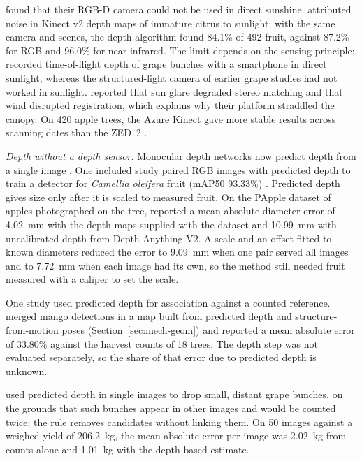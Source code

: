 \citet{wang2017tree} found that their RGB-D camera could not be used in direct sunshine. \citet{choi2017performance} attributed noise in Kinect v2 depth maps of immature citrus to sunlight; with the same camera and scenes, the depth algorithm found 84.1\% of 492 fruit, against 87.2\% for RGB and 96.0\% for near-infrared. The limit depends on the sensing principle: \citet{parr2023grape} recorded time-of-flight depth of grape bunches with a smartphone in direct sunlight, whereas the structured-light camera of earlier grape studies had not worked in sunlight. \citet{qureshi2023seeing} reported that sun glare degraded stereo matching and that wind disrupted registration, which explains why their platform straddled the canopy. On 420 apple trees, the Azure Kinect gave more stable results across scanning dates than the ZED~2 \citep{felippomes2026video}.

\textit{Depth without a depth sensor.} Monocular depth networks now predict depth from a single image \citep{ranftl2021vision}. One included study paired RGB images with predicted depth to train a detector for \textit{Camellia oleifera} fruit (mAP50 93.33\%) \citep{chen2026ciafnet}. Predicted depth gives size only after it is scaled to measured fruit. On the PApple dataset of apples photographed on the tree, \citet{tan2025apple} reported a mean absolute diameter error of 4.02~mm with the depth maps supplied with the dataset and 10.99~mm with uncalibrated depth from Depth Anything V2. A scale and an offset fitted to known diameters reduced the error to 9.09~mm when one pair served all images and to 7.72~mm when each image had its own, so the method still needed fruit measured with a caliper to set the scale.

One study used predicted depth for association against a counted reference. \citet{bellocchio2022novel} merged mango detections in a map built from predicted depth and structure-from-motion poses (Section~\ref{sec:mech-geom}) and reported a mean absolute error of 33.80\% against the harvest counts of 18 trees. The depth step was not evaluated separately, so the share of that error due to predicted depth is unknown.

\citet{ma2026gdyey} used predicted depth in single images to drop small, distant grape bunches, on the grounds that such bunches appear in other images and would be counted twice; the rule removes candidates without linking them. On 50 images against a weighed yield of 206.2~kg, the mean absolute error per image was 2.02~kg from counts alone and 1.01~kg with the depth-based estimate.

